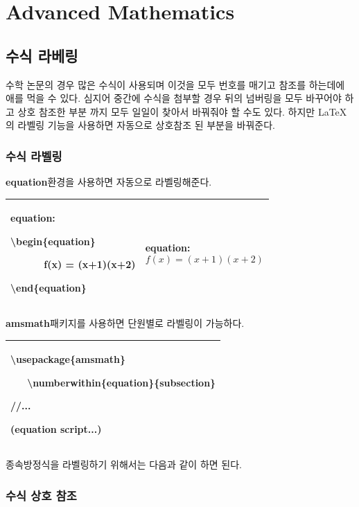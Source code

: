 \documentclass[12pt]{article}
\begin{document}
	\section{Advanced Mathematics}
	\subsection{수식 라베링}
	수학 논문의 경우 많은 수식이 사용되며 이것을 모두 번호를 매기고 참조를 하는데에 애를 먹을 수 있다. 심지어 중간에 수식을 첨부할 경우 뒤의 넘버링을 모두 바꾸어야 하고 상호 참조한 부분 까지 모두 일일이 찾아서 바꿔줘야 할 수도 있다. 하지만 \LaTeX 의 라벨링 기능을 사용하면 자동으로 상호참조 된 부분을 바꿔준다.
	\subsubsection{수식 라벨링}
	\textbf{equation}환경을 사용하면 자동으로 라벨링\를 해준다.\newline
	
	\begin{tabularx}{\textwidth\onehalfspacing}{|X|X|}
		\hline
		equation:
		
		\textbackslash begin\{equation\}
		
		
		\ \ \ \ \ \ f(x) = (x+1)(x+2)
		
		\textbackslash end\{equation\}
		&equation:
		\begin{equation}
			f(x) = (x+1)(x+2)
		\end{equation}\\
		\hline
	\end{tabularx}
	\newline\newline
	\textbf{amsmath}패키지를 사용하면 단원별로 라벨링이 가능하다. \newline
	
	\begin{tabularx}{\textwidth\onehalfspacing}{|X|}
		\hline
		\textbackslash usepackage\{amsmath\}
		
		\ \ \ \textbackslash numberwithin\{equation\}\{subsection\}
		
		//...
		
		(equation script...)\\
		\hline
	\end{tabularx}
	
	종속방정식을 라벨링하기 위해서는 다음과 같이 하면 된다.
	\subsubsection{수식 상호 참조}
\end{document}
